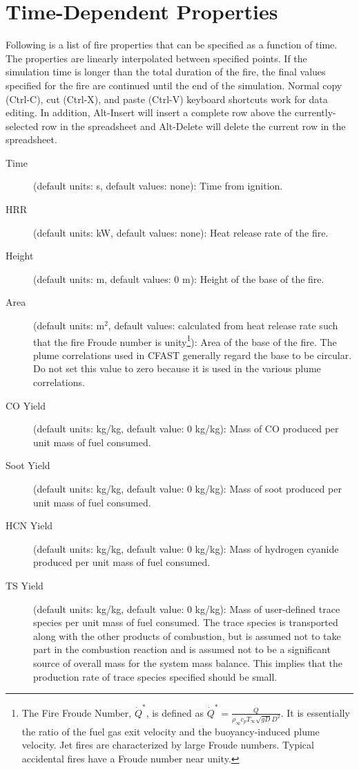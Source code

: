 \section{Time-Dependent Properties}
\label{info:FIRE2}
Following is a list of fire properties that can be specified as a function of time. The properties are linearly interpolated between specified points. If the simulation time is longer than the total duration of the fire, the final values specified for the fire are continued until the end of the simulation. Normal copy (Ctrl-C), cut (Ctrl-X), and paste (Ctrl-V) keyboard shortcuts work for data editing. In addition, Alt-Insert will insert a complete row above the currently-selected row in the spreadsheet and Alt-Delete will delete the current row in the spreadsheet.
\begin{description}
\item[Time] (default units: s, default values: none): Time from ignition.
\item[HRR] (default units: kW, default values: none): Heat release rate of the fire.
\item[Height] (default units: m, default values: 0 m): Height of the base of the fire.
\item[Area] (default units: m$^2$, default values: calculated from heat release rate such that the fire Froude number is unity\footnote{The Fire Froude Number, $\dot{Q}^*$, is defined as $\dot{Q}^* = \frac{\dot{Q}}{\rho_\infty c_p T_\infty \sqrt{gD} D^2}$. It is essentially the ratio of the fuel gas exit velocity and the buoyancy-induced plume velocity. Jet fires are characterized by large Froude numbers. Typical accidental fires have a Froude number near unity.}): Area of the base of the fire. The plume correlations used in CFAST generally regard the base to be circular. Do not set this value to zero because it is used in the various plume correlations.
\item[CO Yield] (default units: kg/kg, default value: 0 kg/kg): Mass of CO produced per unit mass of fuel consumed.
\item[Soot Yield] (default units: kg/kg, default value: 0 kg/kg): Mass of soot produced per unit mass of fuel consumed.
\item[HCN Yield] (default units: kg/kg, default value: 0 kg/kg): Mass of hydrogen cyanide produced per unit mass of fuel consumed.
\item[TS Yield] (default units: kg/kg, default value: 0 kg/kg): Mass of user-defined trace species per unit mass of fuel consumed. The trace species is transported along with the other products of combustion, but is assumed not to take part in the combustion reaction and is assumed not to be a significant source of overall mass for the system mass balance. This implies that the production rate of trace species specified should be small.
\end{description}


